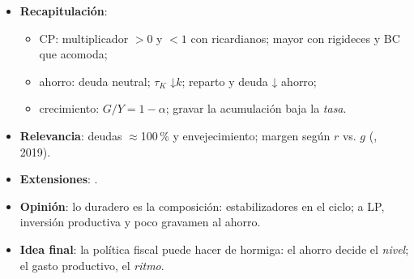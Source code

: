 \documentclass{article}
\begin{document}
\begin{columnas}
\begin{itemize}
\item \textbf{Recapitulación}:
  \begin{itemize}
  \item CP: multiplicador $>0$ y $<1$ con ricardianos; mayor con rigideces y BC que acomoda;
  \item ahorro: deuda neutral; $\tau_K$ ↓$k$; reparto y deuda ↓ ahorro;
  \item crecimiento: $G/Y=1-\alpha$; gravar la acumulación baja la \emph{tasa}.
  \end{itemize}
\item \textbf{Relevancia}: deudas $\approx$100\,\% y envejecimiento; margen según $r$ vs. $g$ (, 2019).
\item \textbf{Extensiones}:      .
\item \textbf{Opinión}: lo duradero es la composición: estabilizadores en el ciclo; a LP, inversión productiva y poco gravamen al ahorro.
\item \textbf{Idea final}: la política fiscal puede hacer de hormiga: el ahorro decide el \emph{nivel}; el gasto productivo, el \emph{ritmo}.
\end{itemize}


\end{columnas}
\end{document}
